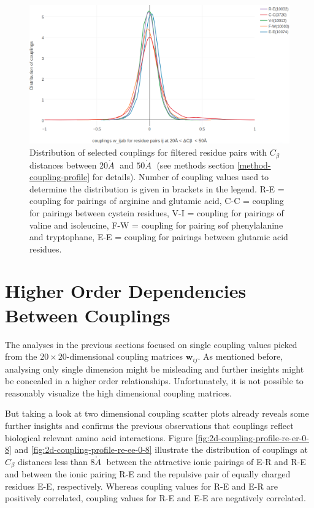 \documentclass[12pt,a4paper,twoside]{book}
\newcommand{\Cb}{C_\beta}
\newcommand{\wij}{\mathbf{w}_{ij}}
\newcommand{\angstrom}{\mathring{A} \;}
\theoremstyle{definition}
\theoremstyle{definition}
\theoremstyle{remark}
\begin{document}
\begin{figure}
\includegraphics[width=1\linewidth]{img/coupling_matrix_analysis/1d_coupling_profile_20_50} \caption{Distribution of selected
couplings for filtered residue pairs with \(\Cb\) distances between
\(20\angstrom\) and \(50 \angstrom\) (see methods section
\ref{method-coupling-profile} for details). Number of coupling values
used to determine the distribution is given in brackets in the legend.
R-E = coupling for pairings of arginine and glutamic acid, C-C =
coupling for pairings between cystein residues, V-I = coupling for
pairings of valine and isoleucine, F-W = coupling for pairing sof
phenylalanine and tryptophane, E-E = coupling for pairings between
glutamic acid residues.}\label{fig:1d-coupling-profile-20-50}
\end{figure}

\section{Higher Order Dependencies Between
Couplings}\label{higher-order-dependencies-between-couplings}

The analyses in the previous sections focused on single coupling values
picked from the \(20 \times 20\)-dimensional coupling matrices \(\wij\).
As mentioned before, analysing only single dimension might be misleading
and further insights might be concealed in a higher order relationships.
Unfortunately, it is not possible to reasonably visualize the high
dimensional coupling matrices.

But taking a look at two dimensional coupling scatter plots already
reveals some further insights and confirms the previous observations
that couplings reflect biological relevant amino acid interactions.
Figure \ref{fig:2d-coupling-profile-re-er-0-8} and
\ref{fig:2d-coupling-profile-re-ee-0-8} illustrate the distribution of
couplings at \(\Cb\) distances less than \(8\angstrom\) between the
attractive ionic pairings of E-R and R-E and between the ionic pairing
R-E and the repulsive pair of equally charged residues E-E,
respectively. Whereas coupling values for R-E and E-R are positively
correlated, coupling values for R-E and E-E are negatively correlated.
\end{document}
